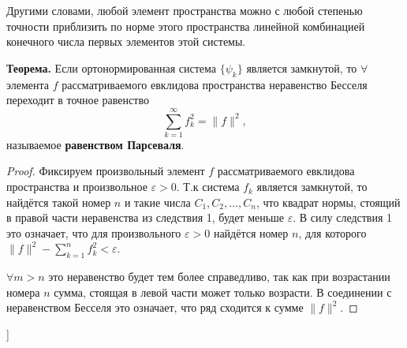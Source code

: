Другими словами, любой элемент пространства можно с любой степенью точности приблизить по норме этого пространства линейной комбинацией конечного числа первых элементов этой системы.

\textbf{Теорема.} Если ортонормированная система $\{\psi_k\}$ является замкнутой, то $\forall$ элемента $f$ рассматриваемого евклидова пространства неравенство Бесселя переходит в точное равенство
$$\displaystyle\sum_{k=1}^{\infty}f_k^2= \| f  \|^2,$$ называемое \textbf{равенством Парсеваля}.

\begin{proof}
Фиксируем произвольный элемент $f$ рассматриваемого евклидова пространства и произвольное $\varepsilon > 0$. 
Т.к система $f_k$ является замкнутой, то найдётся такой номер $n$ и такие числа $C_1, C_2, \dots, C_n$, что квадрат нормы, стоящий в правой части неравенства из следствия 1, будет меньше $\varepsilon$. В силу следствия 1 это означает, что для произвольного $\varepsilon > 0$ найдётся номер $n$, для которого
$ \| f  \|^2- \displaystyle\sum_{k=1}^{n}f_k^2 < \varepsilon$.

$\forall m > n$ это неравенство будет тем более справедливо, так как при возрастании номера $n$ сумма, стоящая в левой части может только возрасти.
В соединении с неравенством Бесселя это означает, что ряд  сходится к сумме $ \| f \|^2$.
\end{proof}

\bigbreak
[\cite[page 69-96]{replace_me}]
